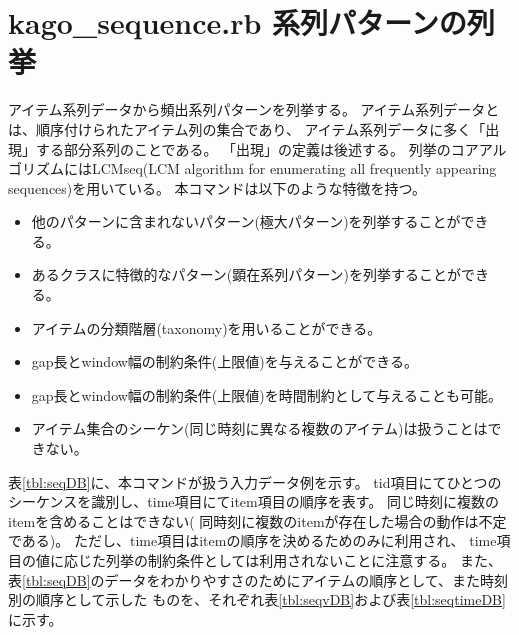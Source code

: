 \documentclass[a4paper]{jarticle}
\begin{document}
\setlength{\baselineskip}{4mm}

\section*{kago\_sequence.rb 系列パターンの列挙}
アイテム系列データから頻出系列パターンを列挙する。
アイテム系列データとは、順序付けられたアイテム列の集合であり、
アイテム系列データに多く「出現」する部分系列のことである。
「出現」の定義は後述する。
列挙のコアアルゴリズムにはLCMseq(LCM algorithm for enumerating all frequently appearing sequences)を用いている\cite{UnoWeb}。
本コマンドは以下のような特徴を持つ。
\begin{itemize}
 \item 他のパターンに含まれないパターン(極大パターン)を列挙することができる。
 \item あるクラスに特徴的なパターン(顕在系列パターン)を列挙することができる。
 \item アイテムの分類階層(taxonomy)を用いることができる。
 \item gap長とwindow幅の制約条件(上限値)を与えることができる。
 \item gap長とwindow幅の制約条件(上限値)を時間制約として与えることも可能。
 \item アイテム集合のシーケン(同じ時刻に異なる複数のアイテム)は扱うことはできない。
\end{itemize}

表\ref{tbl:seqDB}に、本コマンドが扱う入力データ例を示す。
tid項目にてひとつのシーケンスを識別し、time項目にてitem項目の順序を表す。
同じ時刻に複数のitemを含めることはできない(
同時刻に複数のitemが存在した場合の動作は不定である)。
ただし、time項目はitemの順序を決めるためのみに利用され、
time項目の値に応じた列挙の制約条件としては利用されないことに注意する。
また、表\ref{tbl:seqDB}のデータをわかりやすさのためにアイテムの順序として、また時刻別の順序として示した
ものを、それぞれ表\ref{tbl:seqvDB}および表\ref{tbl:seqtimeDB}に示す。
\end{document}
